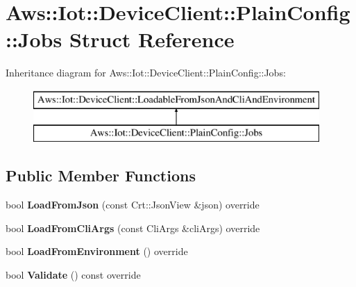 \hypertarget{struct_aws_1_1_iot_1_1_device_client_1_1_plain_config_1_1_jobs}{}\section{Aws\+:\+:Iot\+:\+:Device\+Client\+:\+:Plain\+Config\+:\+:Jobs Struct Reference}
\label{struct_aws_1_1_iot_1_1_device_client_1_1_plain_config_1_1_jobs}
Inheritance diagram for Aws\+:\+:Iot\+:\+:Device\+Client\+:\+:Plain\+Config\+:\+:Jobs\+:\begin{figure}[H]
\begin{center}
\leavevmode
\includegraphics[height=2.000000cm]{struct_aws_1_1_iot_1_1_device_client_1_1_plain_config_1_1_jobs}
\end{center}
\end{figure}
\subsection*{Public Member Functions}
\begin{DoxyCompactItemize}
\item 
\mbox{\label{struct_aws_1_1_iot_1_1_device_client_1_1_plain_config_1_1_jobs_a48bc41a7e9a40e5bfc6f26d2e296aea5}} 
bool {\bfseries Load\+From\+Json} (const Crt\+::\+Json\+View \&json) override
\item 
\mbox{\label{struct_aws_1_1_iot_1_1_device_client_1_1_plain_config_1_1_jobs_ad7f8ad9755adde6553b2dbbe9872a21c}} 
bool {\bfseries Load\+From\+Cli\+Args} (const Cli\+Args \&cli\+Args) override
\item 
\mbox{\label{struct_aws_1_1_iot_1_1_device_client_1_1_plain_config_1_1_jobs_a48cbc72d07852fef775a1a552b1d8164}} 
bool {\bfseries Load\+From\+Environment} () override
\item 
\mbox{\label{struct_aws_1_1_iot_1_1_device_client_1_1_plain_config_1_1_jobs_a518137da5e34ae78547eabdc533fa0ef}} 
bool {\bfseries Validate} () const override
\end{DoxyCompactItemize}
